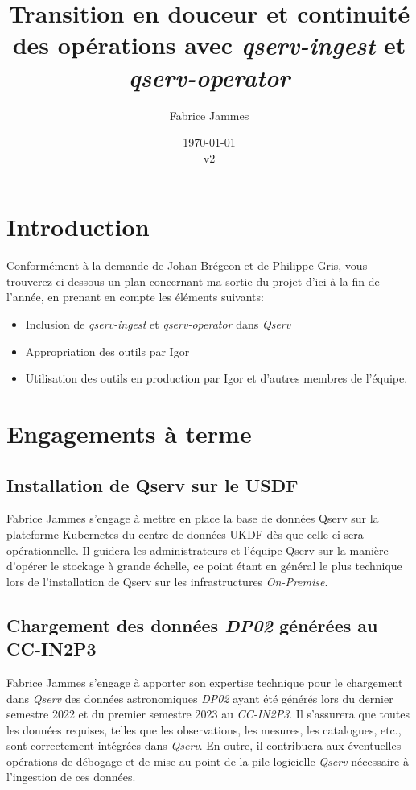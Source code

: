 \documentclass[french] {article}
\title{Transition en douceur et continuité des opérations avec \textit{qserv-ingest} et \textit{qserv-operator}}
\author{Fabrice Jammes}
\date{\today\\v2}
\begin{document}
\maketitle

\section{Introduction}

Conformément à la demande de Johan Brégeon et de Philippe Gris, vous trouverez ci-dessous un plan concernant ma sortie du projet d'ici à la fin de l'année, en prenant en compte les éléments suivants:

\begin{itemize}
\item Inclusion de \textit{qserv-ingest} et \textit{qserv-operator} dans \textit{Qserv}
\item Appropriation des outils par Igor
\item Utilisation des outils en production par Igor et d'autres membres de l'équipe.
\end{itemize}

\section{Engagements à terme}

\subsection{Installation de Qserv sur le USDF}

Fabrice Jammes s'engage à mettre en place la base de données Qserv sur la plateforme Kubernetes du centre de données UKDF dès que celle-ci sera opérationnelle. Il guidera les administrateurs et l'équipe
Qserv sur la manière d'opérer le stockage à grande échelle, ce point étant en général le plus technique lors de l'installation de Qserv sur les infrastructures \textit{On-Premise}.

\subsection{Chargement des données \textit{DP02} générées au CC-IN2P3}

Fabrice Jammes s'engage à apporter son expertise technique pour le chargement dans \textit{Qserv} des données astronomiques \textit{DP02} ayant été générés lors du dernier semestre 2022 et du premier semestre
2023 au \textit{CC-IN2P3}.
Il s'assurera que toutes les données requises, telles que les observations, les mesures, les catalogues, etc., sont correctement intégrées dans \textit{Qserv}. En outre, il contribuera aux éventuelles
opérations de débogage et de mise au point de la pile logicielle \textit{Qserv} nécessaire à l'ingestion de ces données.
\end{document}
